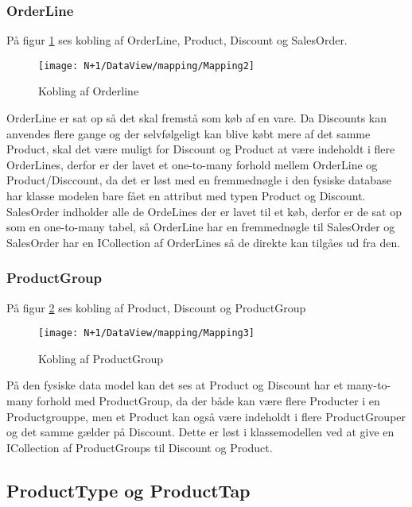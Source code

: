 \subsubsection{OrderLine}
På figur \ref{fig:Mapping_Orderline} ses kobling af OrderLine, Product, Discount og SalesOrder. 

\begin{figure}[H]
    \centering
    \texttt{[image: N+1/DataView/mapping/Mapping2]}
    \caption{Kobling af Orderline}
    \label{fig:Mapping_Orderline}
\end{figure}

OrderLine er sat op så det skal fremstå som køb af en vare. Da Discounts kan anvendes flere gange og der selvfølgeligt kan blive købt mere af det samme Product, skal det være muligt for Discount og Product at være indeholdt i flere OrderLines, derfor er der lavet et one-to-many forhold mellem OrderLine og Product/Disccount, da det er løst med en fremmednøgle i den fysiske database har klasse modelen bare fået en attribut med typen Product og Discount. 
\newline\newline
SalesOrder indholder alle de OrdeLines der er lavet til et køb, derfor er de sat op som en one-to-many tabel, så OrderLine har en fremmednøgle til SalesOrder og SalesOrder har en ICollection af OrderLines så de direkte kan tilgåes ud fra den. 

\subsubsection{ProductGroup}
På figur \ref{fig:Mapping_ProductGroup} ses kobling af Product, Discount og ProductGroup
\begin{figure}[H]
    \centering
    \texttt{[image: N+1/DataView/mapping/Mapping3]}
    \caption{Kobling af ProductGroup}
    \label{fig:Mapping_ProductGroup}
\end{figure}

På den fysiske data model kan det ses at Product og Discount har et many-to-many forhold med ProductGroup, da der både kan være flere Producter i en Productgrouppe, men et Product kan også være indeholdt i flere ProductGrouper og det samme gælder på Discount. Dette er løst i klassemodellen ved at give en ICollection af ProductGroups til Discount og Product. 

\subsection{ProductType og ProductTap}

